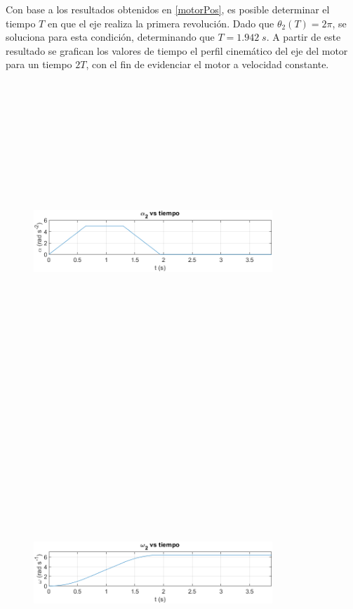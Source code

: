 \documentclass[12pt]{article}
\begin{document}
\normalsize
Con base a los resultados obtenidos en \eqref{motorPos}, es posible determinar el tiempo $T$ en que el eje realiza la primera revolución. Dado que $\theta_2(T)=2\pi$, se soluciona para esta condición, determinando que $T=1.942\;s$. A partir de este resultado se grafican los valores de tiempo el perfil cinemático del eje del motor para un tiempo $2T$, con el fin de evidenciar el motor a velocidad constante.
    \begin{figure} [H]
        \centerline{\includegraphics[width=9cm, height=12cm,keepaspectratio]{Perfiles/perfil cinematico aceleracion.png}}
        \label{}
    \end{figure}
    \vspace{-25pt}
        \begin{figure} [H]
        \centerline{\includegraphics[width=9cm, height=12cm,keepaspectratio]{Perfiles/perfil cinematico velocidad.png}}
        \label{}
    \end{figure}
\end{document}
